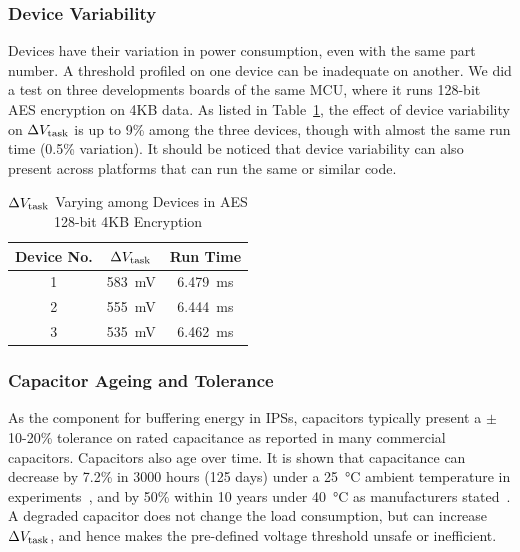 \subsubsection{Device Variability}

Devices have their variation in power consumption, even with the same part number. 
A threshold profiled on one device can be inadequate on another. 
We did a test on three developments boards of the same MCU, where it runs 128-bit AES encryption on 4KB data. 
As listed in Table~\ref{tab:device}, the effect of device variability on $\Delta V_{\text{task}}$ is up to 9\% among the three devices, though with almost the same run time (0.5\% variation). 
It should be noticed that device variability can also present across platforms that can run the same or similar code. 

\begin{table}
    \renewcommand{\arraystretch}{1.2}
    \centering
    \caption{$\Delta V_{\text{task}}$ Varying among Devices in AES 128-bit 4KB Encryption}
    \label{tab:device}
    \begin{tabular}{|c|c|c|}
    \hline
    \textbf{Device No.} & \textbf{$\Delta V_{\text{task}}$} & \textbf{Run Time} \\
    \hline
    1 & \SI{583}{\milli\volt} & \SI{6.479}{\milli\second} \\
    2 & \SI{555}{\milli\volt} & \SI{6.444}{\milli\second} \\
    3 & \SI{535}{\milli\volt} & \SI{6.462}{\milli\second} \\
    \hline
    \end{tabular}
\end{table}

\subsubsection{Capacitor Ageing and Tolerance}
\label{subsubsec:capacitance_variability}

As the component for buffering energy in IPSs, capacitors typically present a $\pm$10-20\% tolerance on rated capacitance as reported in many commercial capacitors. 
Capacitors also age over time. 
It is shown that capacitance can decrease by 7.2\% in 3000 hours (125 days) under a \SI{25}{\celsius} ambient temperature in experiments~\cite{kulkarni2010experimental}, and by 50\% within 10 years under \SI{40}{\celsius} as manufacturers stated~\cite{vishaycapacitor}.
A degraded capacitor does not change the load consumption, but can increase $\Delta V_{\text{task}}$, and hence makes the pre-defined voltage threshold unsafe or inefficient. 


